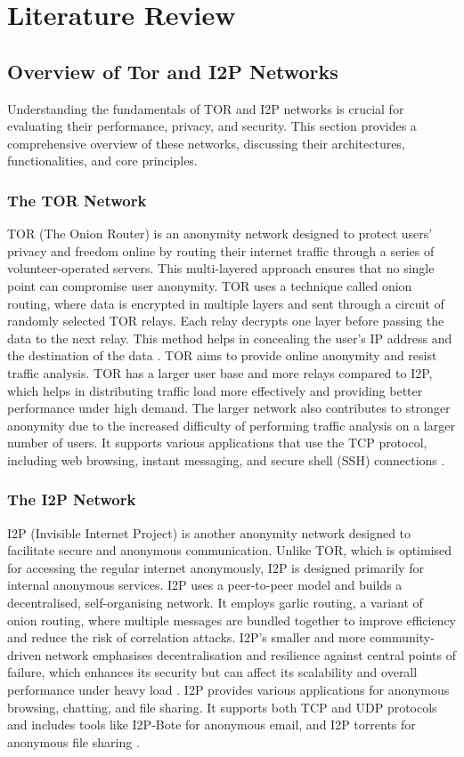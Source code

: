 \documentclass[12pt,conference]{IEEEtran}
\begin{document}
\section{Literature Review}
\subsection{Overview of Tor and I2P Networks}
Understanding the fundamentals of TOR and I2P networks is crucial for evaluating their performance, privacy, and security. This section provides a comprehensive overview of these networks, discussing their architectures, functionalities, and core principles.
\subsubsection{The TOR Network} 
TOR (The Onion Router) is an anonymity network designed to protect users' privacy and freedom online by routing their internet traffic through a series of volunteer-operated servers. This multi-layered approach ensures that no single point can compromise user anonymity. TOR uses a technique called onion routing, where data is encrypted in multiple layers and sent through a circuit of randomly selected TOR relays. Each relay decrypts one layer before passing the data to the next relay. This method helps in concealing the user's IP address and the destination of the data \cite{TorTheSecondGenerationOnionRouter}. TOR aims to provide online anonymity and resist traffic analysis. TOR has a larger user base and more relays compared to I2P, which helps in distributing traffic load more effectively and providing better performance under high demand. The larger network also contributes to stronger anonymity due to the increased difficulty of performing traffic analysis on a larger number of users. It supports various applications that use the TCP protocol, including web browsing, instant messaging, and secure shell (SSH) connections \cite{TorTheSecondGenerationOnionRouter}.
\subsubsection{The I2P Network}
I2P (Invisible Internet Project) is another anonymity network designed to facilitate secure and anonymous communication. Unlike TOR, which is optimised for accessing the regular internet anonymously, I2P is designed primarily for internal anonymous services. I2P uses a peer-to-peer model and builds a decentralised, self-organising network. It employs garlic routing, a variant of onion routing, where multiple messages are bundled together to improve efficiency and reduce the risk of correlation attacks. I2P's smaller and more community-driven network emphasises decentralisation and resilience against central points of failure, which enhances its security but can affect its scalability and overall performance under heavy load \cite{i2p}. I2P provides various applications for anonymous browsing, chatting, and file sharing. It supports both TCP and UDP protocols and includes tools like I2P-Bote for anonymous email, and I2P torrents for anonymous file sharing \cite{zantout02}.
\end{document}
